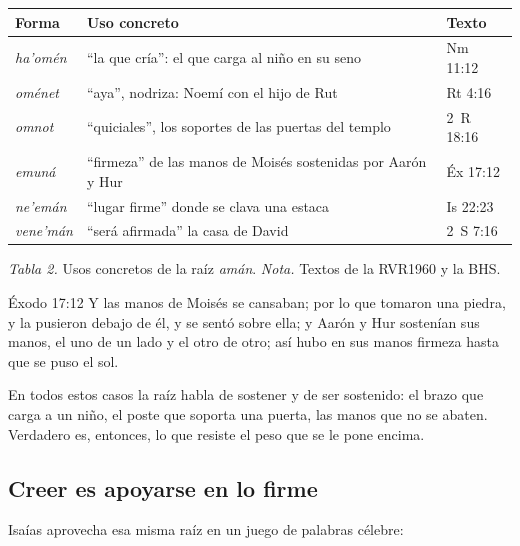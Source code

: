 \begin{center}\small\renewcommand{\arraystretch}{1.18}
\begin{tabular}{@{}L{3.3cm}L{7.4cm}L{3.6cm}@{}}
\toprule
\textbf{Forma} & \textbf{Uso concreto} & \textbf{Texto} \\ \midrule
{} \emph{ha'omén} & ``la que cría'': el que carga al niño en su seno & Nm 11:12 \\
 \emph{oménet} & ``aya'', nodriza: Noemí con el hijo de Rut & Rt 4:16 \\
 \emph{omnot} & ``quiciales'', los soportes de las puertas del templo & 2~R 18:16 \\
 \emph{emuná} & ``firmeza'' de las manos de Moisés sostenidas por Aarón y Hur & Éx 17:12 \\
 \emph{ne'emán} & ``lugar firme'' donde se clava una estaca & Is 22:23 \\
 \emph{vene'mán} & ``será afirmada'' la casa de David & 2~S 7:16 \\
\bottomrule
\end{tabular}\par
{\footnotesize\color{gris}\textit{Tabla 2.} Usos concretos de la raíz \emph{amán}. \textit{Nota.} Textos de la RVR1960 y la BHS.}
\end{center}

\begin{verso}{Éxodo 17:12}
Y las manos de Moisés se cansaban; por lo que tomaron una piedra, y la pusieron debajo de él, y se sentó sobre ella; y Aarón y Hur sostenían sus manos, el uno de un lado y el otro de otro; así hubo en sus manos firmeza hasta que se puso el sol.
\end{verso}

En todos estos casos la raíz habla de sostener y de ser sostenido: el brazo que carga a un niño, el poste que soporta una puerta, las manos que no se abaten. Verdadero es, entonces, lo que resiste el peso que se le pone encima.


\subsection{Creer es apoyarse en lo firme}
Isaías aprovecha esa misma raíz en un juego de palabras célebre:

